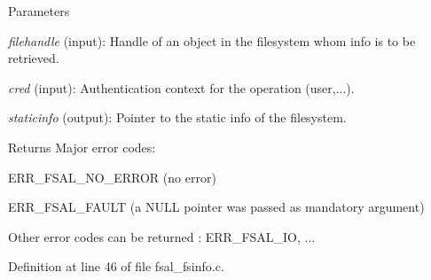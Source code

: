 \begin{DoxyParams}{Parameters}
\item[{\em filehandle}](input): Handle of an object in the filesystem whom info is to be retrieved. \item[{\em cred}](input): Authentication context for the operation (user,...). \item[{\em staticinfo}](output): Pointer to the static info of the filesystem.\end{DoxyParams}
\begin{DoxyReturn}{Returns}
Major error codes:
\begin{DoxyItemize}
\item ERR\_\-FSAL\_\-NO\_\-ERROR (no error)
\item ERR\_\-FSAL\_\-FAULT (a NULL pointer was passed as mandatory argument)
\item Other error codes can be returned : ERR\_\-FSAL\_\-IO, ... 
\end{DoxyItemize}
\end{DoxyReturn}


Definition at line 46 of file fsal\_\-fsinfo.c.